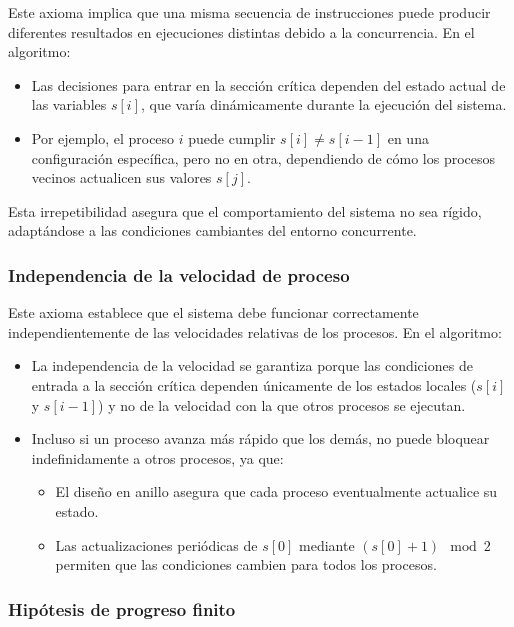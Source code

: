\documentclass[a4paper,12pt]{article}
\begin{document}
Este axioma implica que una misma secuencia de instrucciones puede producir diferentes resultados en ejecuciones distintas debido a la concurrencia. En el algoritmo:

\begin{itemize}
    \item Las decisiones para entrar en la sección crítica dependen del estado actual de las variables \( s[i] \), que varía dinámicamente durante la ejecución del sistema.
    \item Por ejemplo, el proceso \( i \) puede cumplir \( s[i] \neq s[i-1] \) en una configuración específica, pero no en otra, dependiendo de cómo los procesos vecinos actualicen sus valores \( s[j] \).
\end{itemize}

Esta irrepetibilidad asegura que el comportamiento del sistema no sea rígido, adaptándose a las condiciones cambiantes del entorno concurrente.

\subsubsection{Independencia de la velocidad de proceso}

Este axioma establece que el sistema debe funcionar correctamente independientemente de las velocidades relativas de los procesos. En el algoritmo:

\begin{itemize}
    \item La independencia de la velocidad se garantiza porque las condiciones de entrada a la sección crítica dependen únicamente de los estados locales (\( s[i] \) y \( s[i-1] \)) y no de la velocidad con la que otros procesos se ejecutan.
    \item Incluso si un proceso avanza más rápido que los demás, no puede bloquear indefinidamente a otros procesos, ya que:
    \begin{itemize}
        \item El diseño en anillo asegura que cada proceso eventualmente actualice su estado.
        \item Las actualizaciones periódicas de \( s[0] \) mediante \( (s[0] + 1) \mod 2 \) permiten que las condiciones cambien para todos los procesos.
    \end{itemize}
\end{itemize}

\subsubsection{Hipótesis de progreso finito}
\end{document}
